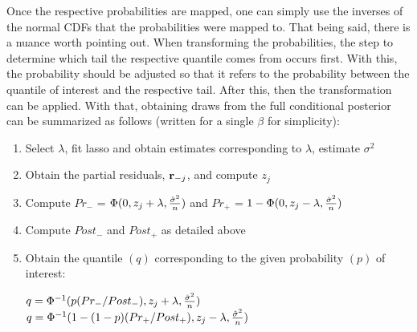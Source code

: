 

Once the respective probabilities are mapped, one can simply use the inverses of the normal CDFs that the probabilities were mapped to. That being said, there is a nuance worth pointing out. When transforming the probabilities, the step to determine which tail the respective quantile comes from occurs first. With this, the probability should be adjusted so that it refers to the probability between the quantile of interest and the respective tail. After this, then the transformation can be applied. With that, obtaining draws from the full conditional posterior can be summarized as follows (written for a single $\beta$ for simplicity):

\begin{enumerate}
  \item Select $\lambda$, fit lasso and obtain estimates corresponding to $\lambda$, estimate $\sigma^2$
	\item Obtain the partial residuals, $\mathbf{r}_{-j}$, and compute $z_j$
	\item Compute $Pr_{-}$ = $\Phi(0, z_j + \lambda, \frac{\hat{\sigma}^2}{n})$ and $Pr_{+}$ = $1 - \Phi(0, z_j - \lambda, \frac{\hat{\sigma}^2}{n})$
	\item Compute $Post_-$ and $Post_+$ as detailed above
	\item Obtain the quantile $(q)$ corresponding to the given probability $(p)$ of interest:
  \begin{algorithmic}
      \State $q = \Phi^{-1}(p(Pr_{-} / Post_{-}), z_j + \lambda, \frac{\hat{\sigma}^2}{n})$
    \Else
        \State $q = \Phi^{-1}(1 - (1 - p)(Pr_{+} / Post_{+}), z_j - \lambda, \frac{\hat{\sigma}^2}{n})$
    \EndIf
  \end{algorithmic}
\end{enumerate}
  
